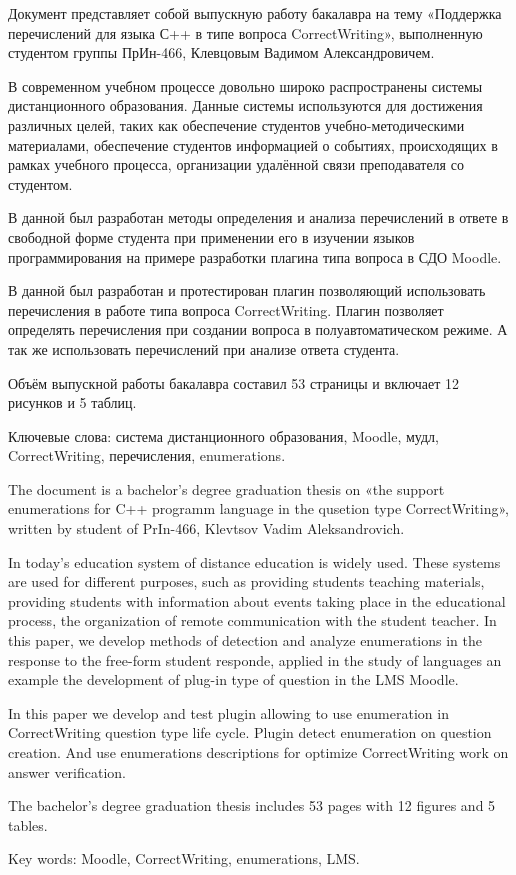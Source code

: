 \documentclass[a4paper,english,russian]{G2-105}
\begin{document}
\VSTUSetDocumentCode{}
\par Документ представляет собой выпускную работу бакалавра на тему «Поддержка перечислений для языка С++ в типе вопроса CorrectWriting», выполненную студентом группы ПрИн-466, Клевцовым Вадимом Александровичем.
\par В современном учебном процессе довольно широко распространены системы дистанционного образования. Данные системы используются для достижения различных целей, таких как обеспечение студентов учебно-методическими материалами, обеспечение студентов информацией о событиях, происходящих в рамках учебного процесса, организации удалённой связи преподавателя со студентом. 
\par В данной был разработан методы определения и анализа перечислений в ответе в свободной форме  студента при применении его в изучении языков программирования на примере разработки плагина типа вопроса в СДО Moodle.
\par В данной был разработан и протестирован плагин позволяющий использовать перечисления в работе типа вопроса CorrectWriting. Плагин позволяет определять перечисления при создании вопроса в полуавтоматическом режиме. А так же использовать перечислений при анализе ответа студента.
\par Объём выпускной работы бакалавра составил 53 страницы и включает 12 рисунков и 5 таблиц.
\par Ключевые слова: система дистанционного образования, Moodle, мудл, CorrectWriting, перечисления, enumerations.
\par The document is a bachelor's degree graduation thesis on «the support enumerations for C++ programm language in the qusetion type CorrectWriting», written by student of PrIn-466, Klevtsov Vadim Aleksandrovich.
\par In today's education system of distance education is widely used. These systems are used for different purposes, such as providing students teaching materials, providing students with information about events taking place in the educational process, the organization of remote communication with the student teacher.
In this paper, we develop methods of detection and analyze enumerations in the response to the free-form student responde, applied in the study of languages an example the development of plug-in type of question in the LMS Moodle.
\par In this paper we develop and test plugin allowing to use enumeration in CorrectWriting question type life cycle. Plugin detect enumeration on question creation. And use enumerations descriptions for optimize CorrectWriting work on answer verification.
\par The bachelor's degree graduation thesis includes 53 pages with 12 figures and 5 tables.
\par Key words: Moodle, CorrectWriting, enumerations, LMS.
\end{document}
